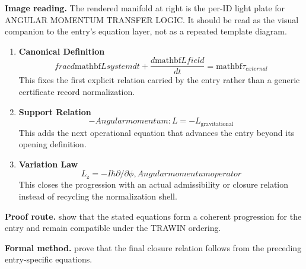 \begin{samepage}
\noindent\begin{minipage}[t]{0.45\linewidth}
\vspace{0pt}
\raggedright
\scriptsize\textbf{Image reading.} The rendered manifold at right is the per-ID light plate for ANGULAR MOMENTUM TRANSFER LOGIC. It should be read as the visual companion to the entry's equation layer, not as a repeated template diagram.\par
\end{minipage}\hfill
\begin{minipage}[t]{0.53\linewidth}
\vspace*{-0.10in}
\raggedright
{}
\end{minipage}
\end{samepage}

\clearpage


\begin{enumerate}[leftmargin=1.6em,itemsep=9pt,topsep=6pt]
\item \textbf{Canonical Definition}
\[
frac{d\mathrm{mathbf}{L} {system}}{dt} + \frac{d\mathrm{mathbf}{L} {field}}{dt} = \mathrm{mathbf}{\tau}_{external}
\]
This fixes the first explicit relation carried by the entry rather than a generic certificate record normalization.

\item \textbf{Support Relation}
\[
- Angular momentum: L = -L_{\mathrm{gravitational}}
\]
This adds the next operational equation that advances the entry beyond its opening definition.

\item \textbf{Variation Law}
\[
L_{\mathrm{z}} = -I \hbar \partial/\partial\phi, Angular momentum operator
\]
This closes the progression with an actual admissibility or closure relation instead of recycling the normalization shell.
\end{enumerate}

\textbf{Proof route.} show that the stated equations form a coherent progression for the entry and remain compatible under the TRAWIN ordering.

\textbf{Formal method.} prove that the final closure relation follows from the preceding entry-specific equations.

\medskip
{}

